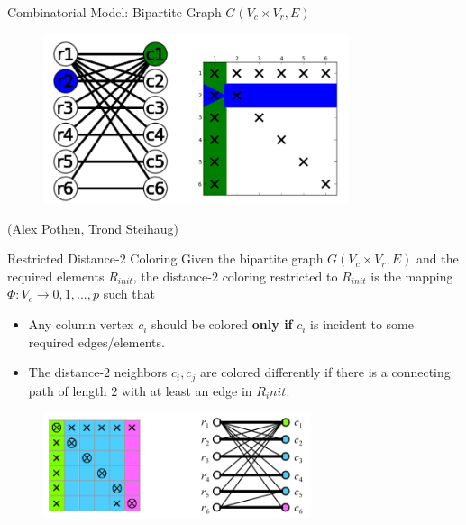 \documentclass{beamer}
\begin{document}
\begin{frame}{Combinatorial Model: Bipartite Graph}
$G(V_c\times V_r,E)$
\begin{figure}
\centering
\includegraphics[width=0.8\textwidth]{bip}
\end{figure}

(Alex Pothen, Trond Steihaug)
\end{frame}

\begin{frame}{Restricted Distance-$2$ Coloring}
Given the bipartite graph $G(V_c\times V_r,E)$ and the required elements
$R_{init}$, the distance-$2$ coloring restricted to $R_{init}$ is the mapping 
$\Phi:V_c\to {0,1,...,p}$ such that
\begin{itemize}
\item Any column vertex $c_i$ should be colored \textbf{only if} $c_i$ is incident to some required edges/elements.
\item The distance-$2$ neighbors $c_i, c_j$ are colored differently
if there is a connecting path of length $2$ with at least an edge in $R_init$.
\end{itemize}
\begin{figure}
\centering
\includegraphics[width=0.7\textwidth]{restricted_distance2}
\end{figure}
\end{frame}
\end{document}
